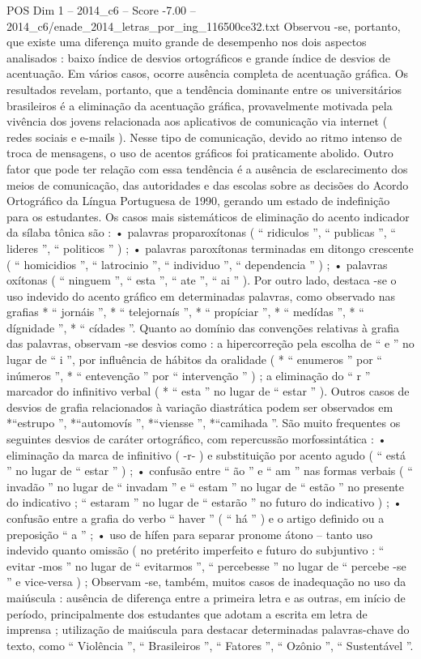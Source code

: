 \begin{textsample}{POS Dim 1 – 2014\_c6 – Score -7.00 – 2014\_c6/enade\_2014\_letras\_por\_ing\_116500ce32.txt}
Observou -se, portanto, que existe uma diferença muito grande de desempenho nos dois aspectos analisados : baixo índice de desvios ortográficos e grande índice de desvios de acentuação.
Em vários casos, ocorre ausência completa de acentuação gráfica.
Os resultados revelam, portanto, que a tendência dominante entre os universitários brasileiros é a eliminação da acentuação gráfica, provavelmente motivada pela vivência dos jovens relacionada aos aplicativos de comunicação via internet ( redes sociais e e-mails ).
Nesse tipo de comunicação, devido ao ritmo intenso de troca de mensagens, o uso de acentos gráficos foi praticamente abolido.
Outro fator que pode ter relação com essa tendência é a ausência de esclarecimento dos meios de comunicação, das autoridades e das escolas sobre as decisões do Acordo Ortográfico da Língua Portuguesa de 1990, gerando um estado de indefinição para os estudantes.
Os casos mais sistemáticos de eliminação do acento indicador da sílaba tônica são : • palavras proparoxítonas ( “ ridiculos ”, “ publicas ”, “ lideres ”, “ politicos ” ) ; • palavras paroxítonas terminadas em ditongo crescente ( “ homicidios ”, “ latrocinio ”, “ individuo ”, “ dependencia ” ) ; • palavras oxítonas ( “ ninguem ”, “ esta ”, “ ate ”, “ ai ” ).
Por outro lado, destaca -se o uso indevido do acento gráfico em determinadas palavras, como observado nas grafias * “ jornáis ”, * “ telejornaís ”, * “ propíciar ”, * “ medídas ”, * “ dígnidade ”, * “ cídades ”.
Quanto ao domínio das convenções relativas à grafia das palavras, observam -se desvios como : a hipercorreção pela escolha de “ e ” no lugar de “ i ”, por influência de hábitos da oralidade ( * “ enumeros ” por “ inúmeros ”, * “ entevenção ” por “ intervenção ” ) ; a eliminação do “ r ” marcador do infinitivo verbal ( * “ esta ” no lugar de “ estar ” ).
Outros casos de desvios de grafia relacionados à variação diastrática podem ser observados em *“estrupo ”, *“automovís ”, *“viensse ”, *“camihada ”.
São muito frequentes os seguintes desvios de caráter ortográfico, com repercussão morfossintática : • eliminação da marca de infinitivo ( -r- ) e substituição por acento agudo ( “ está ” no lugar de “ estar ” ) ; • confusão entre “ ão ” e “ am ” nas formas verbais ( “ invadão ” no lugar de “ invadam ” e “ estam ” no lugar de “ estão ” no presente do indicativo ; “ estaram ” no lugar de “ estarão ” no futuro do indicativo ) ; • confusão entre a grafia do verbo “ haver ” ( “ há ” ) e o artigo definido ou a preposição “ a ” ; • uso de hífen para separar pronome átono – tanto uso indevido quanto omissão ( no pretérito imperfeito e futuro do subjuntivo : “ evitar -mos ” no lugar de “ evitarmos ”, “ percebesse ” no lugar de “ percebe -se ” e vice-versa ) ; Observam -se, também, muitos casos de inadequação no uso da maiúscula : ausência de diferença entre a primeira letra e as outras, em início de período, principalmente dos estudantes que adotam a escrita em letra de imprensa ; utilização de maiúscula para destacar determinadas palavras-chave do texto, como “ Violência ”, “ Brasileiros ”, “ Fatores ”, “ Ozônio ”, “ Sustentável ”.

\end{textsample}
